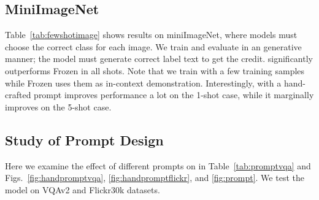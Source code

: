 \subsection{MiniImageNet}
Table~\ref{tab:fewshotimage} shows results on miniImageNet, where models must choose the correct class for each image.
We train and evaluate \method\xspace in an generative manner; the model must generate correct label text to get the credit.
\method\xspace significantly outperforms Frozen in all shots. Note that we train \method\xspace with a few training samples while Frozen uses them as in-context demonstration.
Interestingly, \method\xspace with a hand-crafted prompt improves performance a lot on the 1-shot case, while it marginally improves on the 5-shot case.













\begin{table}[tb!]
\centering
\caption{\textbf{Zero-shot results of hand-crafted prompts.} We test different input prompts in zero-shot predictions.
We use a CIDEr metric for Flickr30k.
Note that zero-shot setting does not require target prompts.
}
\label{tab:promptvqa}
\end{table}






\subsection{Study of Prompt Design}
\label{sec:exp:prompts}



Here we examine the effect of different prompts on \method in Table~\ref{tab:promptvqa} and Figs.~\ref{fig:handpromptvqa}, \ref{fig:handpromptflickr}, and \ref{fig:prompt}.
We test the model on VQAv2 and Flickr30k datasets.



